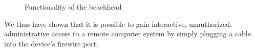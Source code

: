 
\begin{figure}[htb] \begin{center}

	\epsfysize 4.5cm


	\caption{Functionality of the beachhead}

	\label{fig:functionality_beachhead}

\end{center}\end{figure}


We thus have shown that it is possible to gain interactive, unauthorized,
administrative access to a remote computer system by simply plugging a cable
into the device's firewire port.


